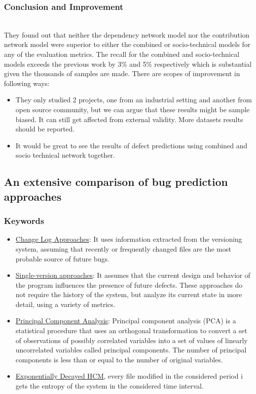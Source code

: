 \documentclass[conference]{IEEEtran}
\begin{document}
\subsubsection{\textbf{Conclusion and Improvement}}

\\They found out that neither the dependency network
model nor the contribution network model were superior to
either the combined or socio-technical models for any of the
evaluation metrics. The recall for the combined and socio-technical models exceeds the previous work by 3\% and 5\% respectively which is substantial given the thousands of samples are made. There are scopes of improvement in following ways:
\begin{itemize}
    \item They only studied 2 projects, one from an industrial setting and another from open source community, but we can argue that these results might be sample biased. It can still get affected from external validity. More datasets results should be reported.
    \item It would be great to see the results of defect predictions using combined and socio technical network together.
\end{itemize}


\subsection{\textbf{An extensive comparison of bug prediction approaches~\cite{d2010extensive}}}
\subsubsection{\textbf{Keywords}}
\begin{itemize}
    \item \underline{Change Log Approaches}: It uses information extracted from the versioning system, assuming that recently or frequently changed files are the most probable source of future bugs.
    \item \underline{Single-version approaches}: It assumes that the current design and behavior of the program influences the presence of future defects. These approaches do not require the history of the system, but analyze its current state in more detail, using a variety of metrics.
    \item \underline{Principal Component Analysis}: Principal component analysis (PCA) is a statistical procedure that uses an orthogonal transformation to convert a set of observations of possibly correlated variables into a set of values of linearly uncorrelated variables called principal components. The number of principal components is less than or equal to the number of original variables.
    \item \underline{Exponentially Decayed HCM}, every file modified in the considered period i gets the entropy of the system in the considered time interval.
\end{itemize}
\end{document}
